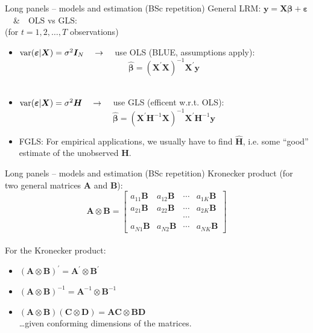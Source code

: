 \documentclass[usenames,dvipsnames]{beamer}
\begin{document}
\begin{frame}{Long panels -- models and estimation (BSc repetition)}
\footnotesize
General LRM: $\bm{y} = \bm{X\beta}+\bm{\varepsilon}$ ~~\&~~OLS vs GLS:\\(for $t=1,2,\dots,T$ observations)\\ \bigskip \bigskip
\begin{itemize}
    \item $\textnormal{var}(\bm{\varepsilon}|\bm{X})=\sigma^2\bm{I}_N \quad \rightarrow \quad$ use OLS (BLUE, assumptions apply):\\ \smallskip $$\bm{\hat{\beta}}=(\bm{X}^{\prime} \bm{X})^{-1} \bm{X}^{\prime} \bm{y}$$ \\ \bigskip \bigskip
    \item $\textnormal{var}(\bm{\varepsilon}|\bm{X})=\sigma^2\bm{H} \quad \rightarrow \quad$ use GLS (efficent w.r.t. OLS):\\ \smallskip $$\bm{\hat{\beta}}=(\bm{X}^{\prime} \bm{H}^{-1} \bm{X})^{-1} \bm{X}^{\prime} \bm{H}^{-1} \bm{y}$$ \bigskip
    \item FGLS: For empirical applications, we usually have to find $\hat{\bm{H}}$, i.e. some ``good'' estimate of the unobserved $\bm{H}$.
\end{itemize}
\end{frame}
\begin{frame}{Long panels -- models and estimation (BSc repetition)}
\footnotesize
Kronecker product (for two general matrices $\bm{A}$ and $\bm{B}$):
$$
\bm{A} \otimes \bm{B} =
\begin{bmatrix}
    a_{11}\bm{B} 	& 	a_{12}\bm{B} 	& 	\cdots	& 	a_{1K}\bm{B} \\
    a_{21}\bm{B} 	& 	a_{22}\bm{B} 	& \cdots 	&   a_{2K}\bm{B}	\\
     		& 		& 	\cdots	& 	 		\\
    a_{N1}\bm{B}    &	a_{N2}\bm{B}	&	\cdots &	a_{NK}\bm{B}
\end{bmatrix}
$$\\ \medskip
For the Kronecker product: \\ \medskip
\begin{itemize}
    \item $(\bm{A} \otimes \bm{B})^{\prime} = \bm{A}^{\prime} \otimes \bm{B}^{\prime}$
    \medskip
    \item $(\bm{A} \otimes \bm{B})^{-1} = \bm{A}^{-1} \otimes \bm{B}^{-1}$
    \medskip
    \item $(\bm{A} \otimes \bm{B})(\bm{C} \otimes \bm{D})= \bm{AC} \otimes \bm{BD}$\\ \smallskip
    \dots given conforming dimensions of the matrices.
\end{itemize}
\end{frame}
\end{document}
